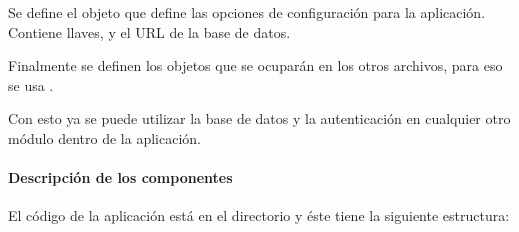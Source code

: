 Se define el objeto que define las opciones de configuración para la aplicación.
Contiene llaves, y el URL de la base de datos.

%
\begin{sphinxVerbatim}[commandchars=\\\{\}]
   
   
   
   
   
   
   
\end{sphinxVerbatim}

Finalmente se definen los objetos que se ocuparán en los otros archivos,
para eso se usa .

%
\begin{sphinxVerbatim}[commandchars=\\\{\}]
    
    
    
\end{sphinxVerbatim}

Con esto ya se puede utilizar la base de datos y la autenticación en cualquier
otro módulo dentro de la aplicación.


\paragraph{Descripción de los componentes}
\label{\detokenize{code_docs:descripcion-de-los-componentes}}
El código de la aplicación está en el directorio  y éste tiene la siguiente
estructura:

